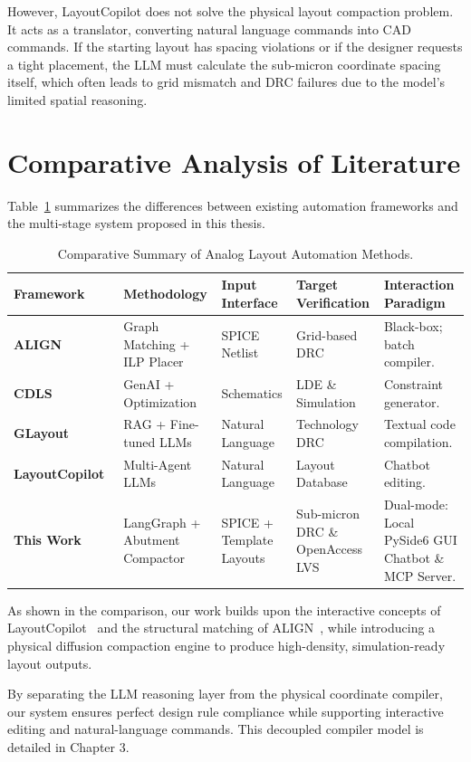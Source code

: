 However, LayoutCopilot does not solve the physical layout compaction problem. It acts as a translator, converting natural language commands into CAD commands. If the starting layout has spacing violations or if the designer requests a tight placement, the LLM must calculate the sub-micron coordinate spacing itself, which often leads to grid mismatch and DRC failures due to the model's limited spatial reasoning.

\section{Comparative Analysis of Literature}
\label{sec:lit_comparison}

Table~\ref{tab:lit_comparison} summarizes the differences between existing automation frameworks and the multi-stage system proposed in this thesis.

\begin{table}[htbp]
    \centering
    \caption{Comparative Summary of Analog Layout Automation Methods.}
    \label{tab:lit_comparison}
    \begin{tabularx}{\textwidth}{l p{2.2cm} p{2.2cm} p{2.2cm} X}
        \toprule
        \textbf{Framework} & \textbf{Methodology} & \textbf{Input Interface} & \textbf{Target Verification} & \textbf{Interaction Paradigm} \\
        \midrule
        \textbf{ALIGN}~\cite{align} & Graph Matching + ILP Placer & SPICE Netlist & Grid-based DRC & Black-box; batch compiler. \\
        \textbf{CDLS}~\cite{cdls} & GenAI + Optimization & Schematics & LDE \& Simulation & Constraint generator. \\
        \textbf{GLayout}~\cite{glayout} & RAG + Fine-tuned LLMs & Natural Language & Technology DRC & Textual code compilation. \\
        \textbf{LayoutCopilot}~\cite{layoutcopilot} & Multi-Agent LLMs & Natural Language & Layout Database & Chatbot editing. \\
        \textbf{This Work} & LangGraph + Abutment Compactor & SPICE + Template Layouts & Sub-micron DRC \& OpenAccess LVS & Dual-mode: Local PySide6 GUI Chatbot \& MCP Server. \\
        \bottomrule
    \end{tabularx}
\end{table}

As shown in the comparison, our work builds upon the interactive concepts of LayoutCopilot~\cite{layoutcopilot} and the structural matching of ALIGN~\cite{align}, while introducing a physical diffusion compaction engine to produce high-density, simulation-ready layout outputs. 

By separating the LLM reasoning layer from the physical coordinate compiler, our system ensures perfect design rule compliance while supporting interactive editing and natural-language commands. This decoupled compiler model is detailed in Chapter 3.
